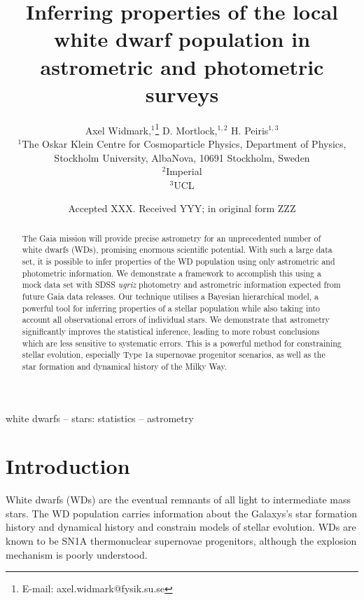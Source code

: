 \documentclass[fleqn,usenatbib]{mnras}
\title[Inferring properties of the white dwarf population]{Inferring properties of the local white dwarf population in astrometric and photometric surveys}
\author[A. Widmark et al.]{
Axel Widmark,$^1$\thanks{E-mail: axel.widmark@fysik.su.se} 
D. Mortlock,$^{1,2}$
H. Peiris$^{1,3}$
\\
$^1$The Oskar Klein Centre for Cosmoparticle Physics, Department of
Physics, Stockholm University, AlbaNova, 10691 Stockholm, Sweden\\
$^2$Imperial\\
$^3$UCL\\
}
\date{Accepted XXX. Received YYY; in original form ZZZ}
\begin{document}
\label{firstpage}
\pagerange{\pageref{firstpage}--\pageref{lastpage}}
\maketitle

\begin{abstract}
The Gaia mission will provide precise astrometry for an unprecedented number of white dwarfs (WDs), promising enormous scientific potential. With such a large data set, it is possible to infer properties of the WD population using only astrometric and photometric information. We demonstrate a framework to accomplish this using a mock data set with SDSS \emph{ugriz} photometry and astrometric information expected from future Gaia data releases.
Our technique utilises a Bayesian hierarchical model, a powerful tool for inferring properties of a stellar population while also taking into account all observational errors of individual stars. We demonstrate that astrometry significantly improves the statistical inference, leading to more robust conclusions which are less sensitive to systematic errors.
This is a powerful method for constraining stellar evolution, especially Type 1a supernovae progenitor scenarios, as well as the star formation and dynamical history of the Milky Way.
\end{abstract}

\begin{keywords}
white dwarfs -- stars: statistics -- astrometry
\end{keywords}









\section{Introduction}

White dwarfs (WDs) are the eventual remnants of all light to intermediate mass stars. The WD population carries information about the Galaxys's star formation history and dynamical history and constrain models of stellar evolution. WDs are known to be SN1A thermonuclear supernovae progenitors, although the explosion mechanism is poorly understood.
\end{document}

